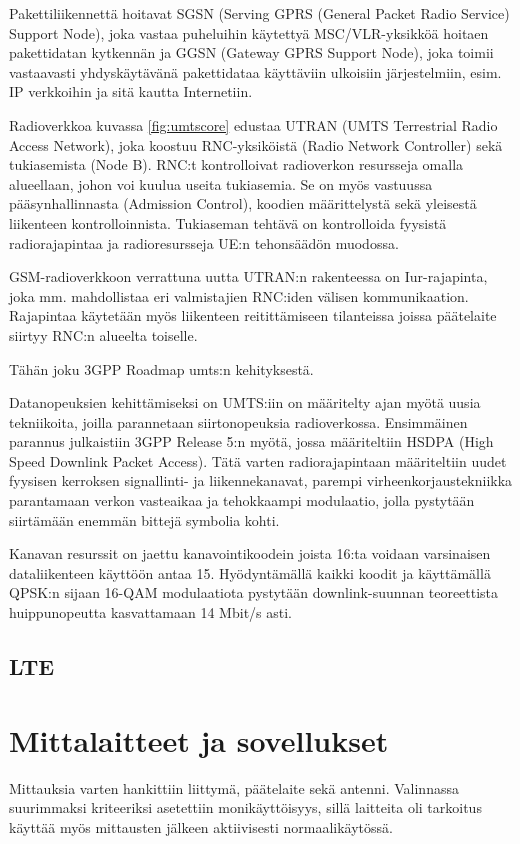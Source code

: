 \documentclass[11pt,a4paper,oneside,article,finnish]{memoir}
\begin{document}
Pakettiliikennettä hoitavat SGSN (Serving GPRS (General Packet Radio Service) Support Node), joka vastaa puheluihin käytettyä MSC/VLR-yksikköä hoitaen pakettidatan kytkennän ja GGSN (Gateway GPRS Support Node), joka toimii vastaavasti yhdyskäytävänä pakettidataa käyttäviin ulkoisiin järjestelmiin, esim. IP verkkoihin ja sitä kautta Internetiin. 

Radioverkkoa kuvassa \ref{fig:umtscore} edustaa UTRAN (UMTS Terrestrial Radio Access Network), joka koostuu RNC-yksiköistä (Radio Network Controller) sekä tukiasemista (Node B). RNC:t kontrolloivat radioverkon resursseja omalla alueellaan, johon voi kuulua useita tukiasemia. Se on myös vastuussa pääsynhallinnasta (Admission Control), koodien määrittelystä sekä yleisestä liikenteen kontrolloinnista. Tukiaseman tehtävä on kontrolloida fyysistä radiorajapintaa ja radioresursseja UE:n tehonsäädön muodossa. 

GSM-radioverkkoon verrattuna uutta UTRAN:n rakenteessa on Iur-rajapinta, joka mm. mahdollistaa eri valmistajien RNC:iden välisen kommunikaation. Rajapintaa käytetään myös liikenteen reitittämiseen tilanteissa joissa päätelaite siirtyy RNC:n alueelta toiselle.

 {\color{red}Tähän joku 3GPP Roadmap umts:n kehityksestä.}

Datanopeuksien kehittämiseksi on UMTS:iin on määritelty ajan myötä uusia tekniikoita, joilla parannetaan siirtonopeuksia radioverkossa. Ensimmäinen parannus julkaistiin 3GPP Release 5:n myötä, jossa määriteltiin HSDPA (High Speed Downlink Packet Access). Tätä varten radiorajapintaan määriteltiin uudet fyysisen kerroksen signallinti- ja liikennekanavat, parempi virheenkorjaustekniikka parantamaan verkon vasteaikaa ja tehokkaampi modulaatio, jolla pystytään siirtämään enemmän bittejä symbolia kohti. 

Kanavan resurssit on jaettu kanavointikoodein joista 16:ta voidaan varsinaisen dataliikenteen käyttöön antaa 15. Hyödyntämällä kaikki koodit ja käyttämällä QPSK:n sijaan 16-QAM modulaatiota pystytään downlink-suunnan teoreettista huippunopeutta kasvattamaan 14 Mbit/s asti. 

\section{LTE}

\chapter{Mittalaitteet ja sovellukset}
Mittauksia varten hankittiin liittymä, päätelaite sekä antenni. Valinnassa suurimmaksi kriteeriksi asetettiin monikäyttöisyys, sillä laitteita oli tarkoitus käyttää myös mittausten jälkeen aktiivisesti normaalikäytössä.
\end{document}
